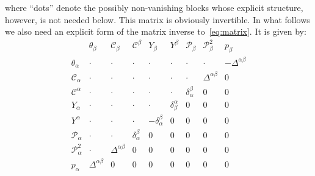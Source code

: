 \documentclass[a4paper,11pt]{amsart}
\numberwithin{thm}{section} %
\numberwithin{equation}{section} %
\numberwithin{figure}{section} %
\renewcommand{\:}{{\rm\, :\,}}
\newcommand{\bl}{{\cdot}}
\def\cP{{\mathcal P}}
\def\cc{{\mathcal C}}
\begin{document}
\noindent
where ``dots'' denote the possibly non-vanishing blocks
whose explicit structure, however, is not needed below.
This matrix is obviously invertible.
In what follows we also need an explicit form of the matrix
inverse to~\eqref{eq:matrix}. It is given by:
\vspace{0.5cm}
\begin{equation}
\label{eq:DM-invers-E}
  \begin{array}{l|cccccccc}
&\theta_\beta & \cc_\beta&\cc^\beta&Y_\beta&Y^\beta &\cP_\beta &\cP^2_\beta& p_\beta\\
\hline
\theta_\alpha &\bl&\bl&\bl&\bl&\bl&\bl  &\bl &-\Delta^{\alpha\beta}\\
\cc_\alpha    &\bl&\bl&\bl&\bl&\bl&\bl&\Delta^{\alpha\beta} &0\\
\cc^\alpha    &\bl&\bl&\bl&\bl&\bl&\delta_\alpha^\beta&0&0\\
Y_\alpha      &\bl&\bl&\bl&\bl &\delta^\alpha_\beta  &0&0&0\\
Y^\alpha      &\bl&\bl&\bl&-\delta_\alpha^\beta &0&0&0&0\\
\cP_\alpha    &\bl &\bl  &\delta_\alpha^\beta  & 0 &0&0&0&0\\
\cP^2_\alpha  &\bl &\Delta^{\alpha\beta}&0&0&0&0&0&0\\
p_\alpha      &\Delta^{\alpha\beta} &0&0& 0&0&0&0&0
\end{array}
\end{equation}
\end{document}
